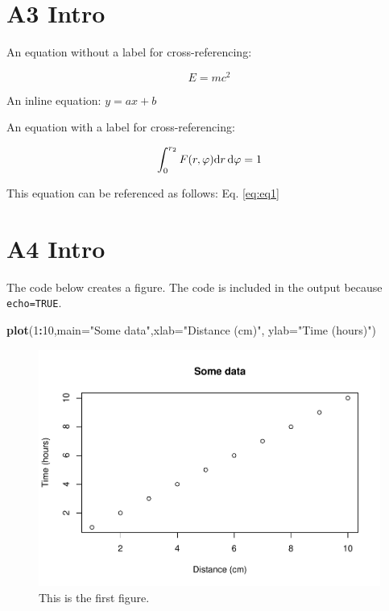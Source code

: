 \documentclass[webpdf,large,contemporary,namedate]{oup-authoring-template}
\newenvironment{Shaded}{\begin{snugshade}}{\end{snugshade}}
\newcommand{\AttributeTok}[1]{\textcolor[rgb]{0.13,0.29,0.53}{#1}}
\newcommand{\DecValTok}[1]{\textcolor[rgb]{0.00,0.00,0.81}{#1}}
\newcommand{\FunctionTok}[1]{\textcolor[rgb]{0.13,0.29,0.53}{\textbf{#1}}}
\newcommand{\NormalTok}[1]{#1}
\newcommand{\SpecialCharTok}[1]{\textcolor[rgb]{0.81,0.36,0.00}{\textbf{#1}}}
\newcommand{\StringTok}[1]{\textcolor[rgb]{0.31,0.60,0.02}{#1}}
\theoremstyle{thmstyleone}
\theoremstyle{thmstyletwo}
\theoremstyle{thmstylethree}
\begin{document}
\hypertarget{a3-intro}{%
\section{A3 Intro}\label{a3-intro}}

An equation without a label for cross-referencing:

\[
E=mc^2
\]

An inline equation: \(y=ax+b\)

An equation with a label for cross-referencing:

\begin{equation}\label{eq:eq1}
\int^{r_2}_0 F(r,\varphi){\rm d}r\,{\rm d}\varphi = 1
\end{equation}

This equation can be referenced as follows: Eq. \ref{eq:eq1}

\hypertarget{a4-intro}{%
\section{A4 Intro}\label{a4-intro}}

The code below creates a figure. The code is included in the output
because \texttt{echo=TRUE}.

\begin{Shaded}
\begin{Highlighting}[]
\FunctionTok{plot}\NormalTok{(}\DecValTok{1}\SpecialCharTok{:}\DecValTok{10}\NormalTok{,}\AttributeTok{main=}\StringTok{"Some data"}\NormalTok{,}\AttributeTok{xlab=}\StringTok{"Distance (cm)"}\NormalTok{,}
     \AttributeTok{ylab=}\StringTok{"Time (hours)"}\NormalTok{)}
\end{Highlighting}
\end{Shaded}

\begin{figure}[th]
\includegraphics[width=1\linewidth]{stochastic_process_1_files/figure-latex/fig1-1} \caption{This is the first figure.}\label{fig:fig1}
\end{figure}
\end{document}
